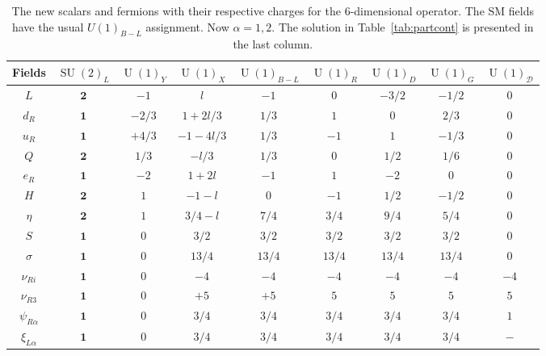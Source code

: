 \documentclass[12pt]{article}
\begin{document}
%
\begin{table}
  \centering
  \begin{tabular}{|c|c|c|c|c|c|c|c||c|}
    \hline  
    Fields     & $\operatorname{SU}(2)_L$ &  $\operatorname{U}(1)_Y $ & $\operatorname{U}(1)_{X}$& $\operatorname{U}(1)_{B-L}$& $\operatorname{U}(1)_R$& $\operatorname{U}(1)_D$& $\operatorname{U}(1)_G$ & $\operatorname{U}(1)_{\mathcal{D}}$\\ \hline
$L $     & $\boldsymbol{2}$ & $-1$ & $l$      &  $-1$&    $0$ &  $-3/2$&  $-1/2$ & $0$ \\    
$d_R $   & $\boldsymbol{1}$ & $-2/3$ & $1+2l/3$ &  $1/3$&    $1$&  $0$&    $2/3$ & $0$\\
$u_R $   & $\boldsymbol{1}$ & $+4/3$ & $-1-4l/3$&  $1/3$&   $-1$&  $1$&   $-1/3$ & $0$ \\
$Q $     & $\boldsymbol{2}$ & $1/3$ & $-l/3$   & $1/3$&    $0$&  $1/2$&  $1/6$ & $0$ \\
$e_R $   & $\boldsymbol{1}$ & $-2$   & $1+2l$   &  $-1$&    $1$ &  $-2$&  $0$ & $0$\\\hline
$H $     & $\boldsymbol{2}$ & $1$  & $-1-l$   &  $0$&    $-1$ &  $1/2$&  $-1/2$ & $0$ \\
$\eta$   & $\boldsymbol{2}$ & $1$ & $3/4-l$  & $7/4$& $3/4$ &$9/4$&$5/4$ & $0$ \\
$S$      & $\boldsymbol{1}$ & $0$    & $3/2$    & $3/2$&  $3/2$ & $3/2$& $3/2$ & $0$\\
$\sigma$ & $\boldsymbol{1}$ & $0$    & $13/4$   & $13/4$&  $13/4$ & $13/4$& $13/4$ & $0$\\\hline
$\nu_{Ri}$& $\boldsymbol{1}$ & $0$   & $-4$& $-4$&  $-4$ & $-4$& $-4$ & $-4$\\
$\nu_{R3}$& $\boldsymbol{1}$ & $0$   & $+5$& $+5$&  $5$ & $5$& $5$ & $5$\\
$\psi_{R\alpha}$  & $\boldsymbol{1}$ & $0$& $3/4$ & $3/4$&  $3/4$ & $3/4$& $3/4$ & $1$ \\\hline
$\xi_{L\alpha}$   & $\boldsymbol{1}$ & $0$ & $3/4$& $3/4$ &  $3/4$ & $3/4$& $3/4$ &$-$\\\hline
  \end{tabular}
  \caption{The new scalars and fermions with their respective charges for the 6-dimensional operator. The SM fields have the usual $U(1)_{B-L}$ assignment. Now $\alpha=1,2$. The solution in Table~\ref{tab:partcont} is presented in the last column.}
    \label{tab:partcont3}
\end{table}
%
\end{document}

